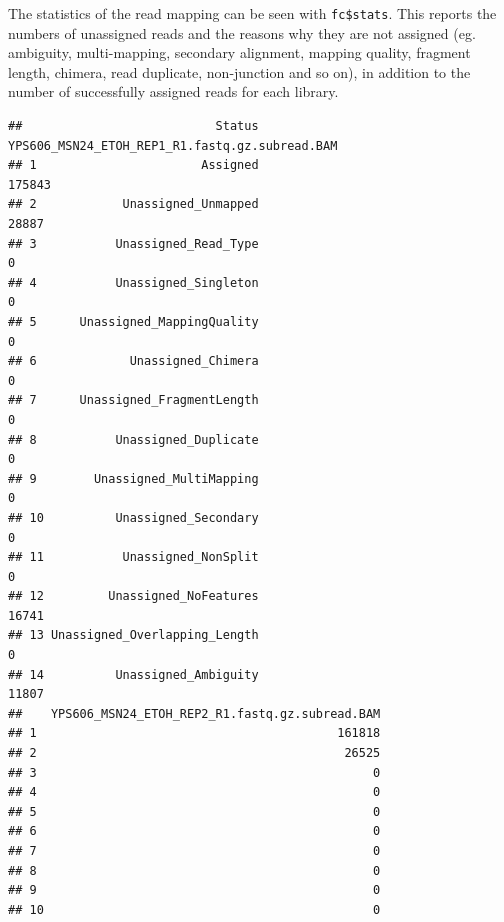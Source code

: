 \documentclass[
]{book}
\newenvironment{Shaded}{\begin{snugshade}}{\end{snugshade}}
\newcommand{\NormalTok}[1]{#1}
\newcommand{\SpecialCharTok}[1]{\textcolor[rgb]{0.81,0.36,0.00}{\textbf{#1}}}
\begin{document}
The statistics of the read mapping can be seen with \texttt{fc\$stats}. This reports the numbers of unassigned reads and the reasons why they are not assigned (eg. ambiguity, multi-mapping, secondary alignment, mapping quality, fragment length, chimera, read duplicate, non-junction and so on), in addition to the number of successfully assigned reads for each library.

\begin{Shaded}
\end{Shaded}

\begin{verbatim}
##                           Status YPS606_MSN24_ETOH_REP1_R1.fastq.gz.subread.BAM
## 1                       Assigned                                         175843
## 2            Unassigned_Unmapped                                          28887
## 3           Unassigned_Read_Type                                              0
## 4           Unassigned_Singleton                                              0
## 5      Unassigned_MappingQuality                                              0
## 6             Unassigned_Chimera                                              0
## 7      Unassigned_FragmentLength                                              0
## 8           Unassigned_Duplicate                                              0
## 9        Unassigned_MultiMapping                                              0
## 10          Unassigned_Secondary                                              0
## 11           Unassigned_NonSplit                                              0
## 12         Unassigned_NoFeatures                                          16741
## 13 Unassigned_Overlapping_Length                                              0
## 14          Unassigned_Ambiguity                                          11807
##    YPS606_MSN24_ETOH_REP2_R1.fastq.gz.subread.BAM
## 1                                          161818
## 2                                           26525
## 3                                               0
## 4                                               0
## 5                                               0
## 6                                               0
## 7                                               0
## 8                                               0
## 9                                               0
## 10                                              0

\end{verbatim}
\end{document}
